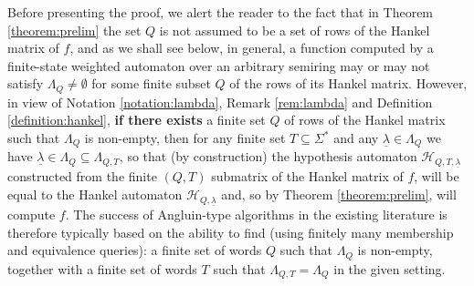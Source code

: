 \documentclass{lmcs}
\numberwithin{theorem}{section}
\begin{document}
\begin{rem}
	\label{rem:rows}
Before presenting the proof, we alert the reader to the fact that in Theorem \ref{theorem:prelim} the set $Q$ is not assumed to be a set of rows of the Hankel matrix of $f$, and as we shall see below, in general, a function computed by a finite-state weighted automaton over an arbitrary semiring may or may not satisfy $\Lambda_Q \neq \emptyset$ for some finite subset $Q$ of the rows of its Hankel matrix.  However, in view of Notation \ref{notation:lambda}, Remark \ref{rem:lambda} and Definition \ref{definition:hankel}, \textbf{if there exists} a finite set $Q$ of rows of the Hankel matrix such that $\Lambda_Q$ is non-empty, then  for any finite set $T \subseteq \Sigma^*$ and any $\underline{\lambda} \in \Lambda_Q$ we have $\underline{\lambda} \in \Lambda_Q \subseteq \Lambda_{Q, T}$, so that (by construction) the hypothesis automaton $\mathcal{H}_{Q, T, \underline{\lambda}}$ constructed from the finite $(Q,T)$ submatrix of the Hankel matrix of $f$, will be equal to the Hankel automaton $\mathcal{H}_{Q, \underline{\lambda}}$ and, so by Theorem \ref{theorem:prelim}, will compute $f$. The success of Angluin-type algorithms in the existing literature is therefore typically based on the ability to find (using finitely many membership and equivalence queries): a finite set of words $Q$ such that $\Lambda_Q$ is non-empty, together with a finite set of words $T$ such that $\Lambda_{Q, T}=\Lambda_Q$ in the given setting.
\end{rem}	
\end{document}
